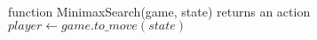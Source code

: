 \documentclass[preview]{standalone}
\begin{document}
\begin{center}
\quad\\function MinimaxSearch(game, state) returns an action\quad\\$player \gets game.to\_move(state)$
\end{center}
\end{document}
